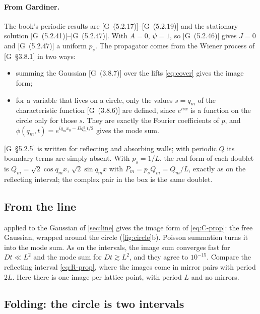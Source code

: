 \documentclass[11pt]{article}
\numberwithin{equation}{section}
\newcommand{\G}[1]{[G~(#1)]}
\newcommand{\Gs}[1]{[G~\S#1]}
\begin{document}
\paragraph{From Gardiner.} The book's periodic results are \G{5.2.17}--\G{5.2.19} and the stationary solution
\G{5.2.41}--\G{5.2.47}. With $A=0$, $\psi=1$, so \G{5.2.46} gives $J=0$ and \G{5.2.47} a uniform $p_s$. The
propagator comes from the Wiener process of \Gs{3.8.1} in two ways:
\begin{itemize}
  \item summing the Gaussian \G{3.8.7} over the lifts \cref{eq:cover} gives the image form;
  \item for a variable that lives on a circle, only the values $s=q_m$ of the characteristic function
        \G{3.8.6} are defined, since $e^{isx}$ is a function on the circle only for those $s$. They are exactly
        the Fourier coefficients of $p$, and $\phi(q_m,t)=e^{iq_mx_0-Dq_m^2t/2}$ gives the mode sum.
\end{itemize}
\Gs{5.2.5} is written for reflecting and absorbing walls; with periodic $Q$ its boundary terms are simply
absent. With $p_s=1/L$, the real form of each doublet is $Q_m=\sqrt2\cos q_mx$, $\sqrt2\sin q_mx$ with
$P_m=p_sQ_m=Q_m/L$, exactly as on the reflecting interval; the complex pair in the box is the same doublet.

\subsection{From the line}

 applied to the Gaussian of \cref{sec:line} gives the image form of \cref{eq:C-prop}: the free
Gaussian, wrapped around the circle (\cref{fig:circle}b). Poisson summation turns it into the mode sum. As on the
intervals, the image sum converges fast for $Dt\ll L^2$ and the mode sum for $Dt\gtrsim L^2$, and they agree to
$10^{-15}$. Compare the reflecting interval \cref{eq:R-prop}, where the images come in mirror pairs with period
$2L$. Here there is one image per lattice point, with period $L$ and no mirrors.

\subsection{Folding: the circle is two intervals}
\end{document}
